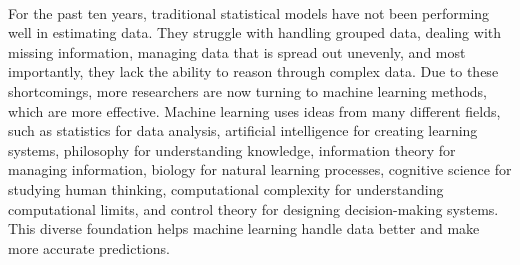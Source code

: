 \\
For the past ten years, traditional statistical models have not been performing well in estimating data. They struggle with handling grouped data, dealing with missing information, managing data that is spread out unevenly, and most importantly, they lack the ability to reason through complex data. Due to these shortcomings, more researchers are now turning to machine learning methods, which are more effective. Machine learning uses ideas from many different fields, such as statistics for data analysis, artificial intelligence for creating learning systems, philosophy for understanding knowledge, information theory for managing information, biology for natural learning processes, cognitive science for studying human thinking, computational complexity for understanding computational limits, and control theory for designing decision-making systems. This diverse foundation helps machine learning handle data better and make more accurate predictions.
\\

